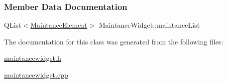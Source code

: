 \subsubsection{Member Data Documentation}
\mbox{\label{classMaintanceWidget_a9c9003f07e28f258c99b996c3c02da45}} 
{\footnotesize\ttfamily Q\+List$<$\mbox{\hyperlink{classMaintanceElement}{Maintance\+Element}}$>$ Maintance\+Widget\+::\texorpdfstring{maintance\+List}{maintanceList}\hspace{0.3cm}{\ttfamily [private]}}


The documentation for this class was generated from the following files\+:\begin{DoxyCompactItemize}
\item 
\mbox{\hyperlink{maintancewidget_8h}{maintancewidget.\+h}}\item 
\mbox{\hyperlink{maintancewidget_8cpp}{maintancewidget.\+cpp}}\end{DoxyCompactItemize}
\newpage